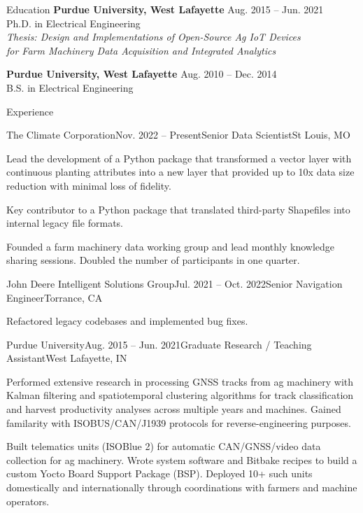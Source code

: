 \documentclass{resume}
\begin{document}
  \begin{rSection}{Education}
    {\bf Purdue University, West Lafayette} \hfill {Aug. 2015 -- Jun. 2021}
    \\
    {Ph.D. in Electrical Engineering} \\
    \textit{Thesis: Design and Implementations of Open-Source Ag IoT Devices \\
      for Farm Machinery Data Acquisition and Integrated Analytics}

    {\bf Purdue University, West Lafayette} \hfill {Aug. 2010 -- Dec. 2014}
    \\ 
    {B.S. in Electrical Engineering} \\
  \end{rSection}

  \begin{rSection}{Experience}
    \begin{rSubsection}{The Climate Corporation}{Nov. 2022 --
      Present}{Senior Data Scientist}{St Louis, MO}
      \item Lead the development of a Python package that transformed a vector
        layer with continuous planting attributes into a new layer that
        provided up to 10x data size reduction with minimal loss of
        fidelity.  
      \item Key contributor to a Python package that translated 
        third-party Shapefiles into internal legacy file formats. 
      \item Founded a farm machinery data working group and lead monthly
        knowledge sharing sessions. Doubled the number of
        participants in one quarter. 
    \end{rSubsection}

    \begin{rSubsection}{John Deere Intelligent Solutions Group}{Jul. 2021 --
      Oct. 2022}{Senior Navigation Engineer}{Torrance, CA}
      \item Refactored legacy codebases and implemented bug fixes. 
    \end{rSubsection}

    \begin{rSubsection}{Purdue University}{Aug. 2015 -- Jun. 2021}{Graduate
        Research / Teaching Assistant}{West Lafayette, IN}
      \item Performed extensive research in processing GNSS tracks from ag
        machinery with Kalman filtering and spatiotemporal clustering
        algorithms for track classification and harvest productivity analyses
        across multiple years and machines. Gained familarity with
        ISOBUS/CAN/J1939 protocols for reverse-engineering purposes. 
      \item Built telematics units (ISOBlue 2) for automatic CAN/GNSS/video
        data collection for ag machinery. Wrote system software and Bitbake
        recipes to build a custom Yocto Board Support Package (BSP). Deployed
        10+ such units domestically and internationally through coordinations
        with farmers and machine operators.
    \end{rSubsection}


\end{rSection}
\end{document}

